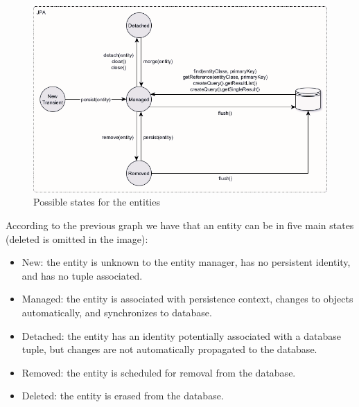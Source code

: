 \documentclass[12pt, a4paper]{report}
\begin{document}
    \begin{figure}[H]
        \centering
        \includegraphics[width=0.75\linewidth]{images/jpaem.png}
        \caption{Possible states for the entities}
    \end{figure}
    According to the previous graph we have that an entity can be in five main states (deleted is omitted in the image): 
    \begin{itemize}
        \item New: the entity is unknown to the entity manager, has no persistent identity, and has no tuple associated. 
        \item Managed: the entity is associated with persistence context, changes to objects automatically, and synchronizes to database. 
        \item Detached: the entity has an identity potentially associated with a database tuple, but changes are not automatically propagated to the database.
        \item Removed: the entity is scheduled for removal from the database.
        \item Deleted: the entity is erased from the database. 
    \end{itemize}
\end{document}
